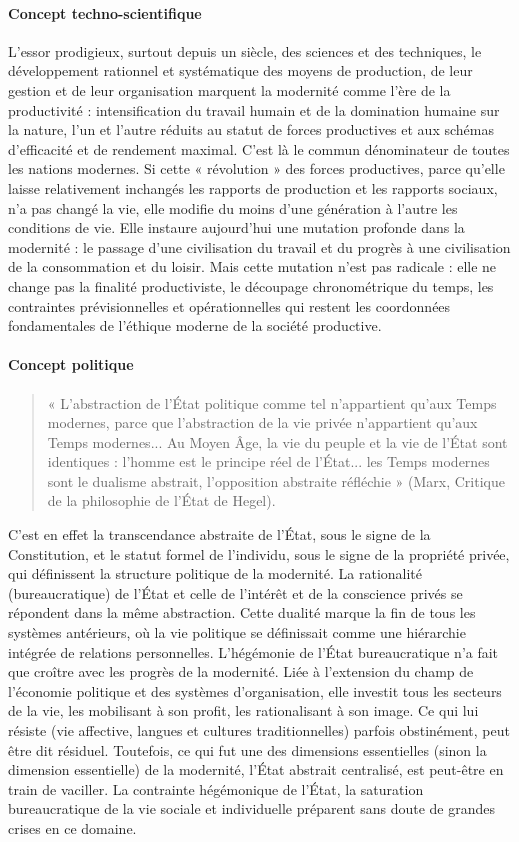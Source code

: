 \paragraph{Concept techno-scientifique}

L'essor prodigieux, surtout depuis un siècle, des sciences et des techniques, le développement rationnel et systématique des moyens de production, de leur gestion et de leur organisation marquent la modernité comme l'ère de la productivité : intensification du travail humain et de la domination humaine sur la nature, l'un et l'autre réduits au statut de forces productives et aux schémas d'efficacité et de rendement maximal. C'est là le commun dénominateur de toutes les nations modernes. Si cette « révolution » des forces productives, parce qu'elle laisse relativement inchangés les rapports de production et les rapports sociaux, n'a pas changé la vie, elle modifie du moins d'une génération à l'autre les conditions de vie. Elle instaure aujourd'hui une mutation profonde dans la modernité : le passage d'une civilisation du travail et du progrès à une civilisation de la consommation et
du loisir. Mais cette mutation n'est pas radicale : elle ne change pas la finalité productiviste, le découpage chronométrique du temps, les contraintes prévisionnelles et opérationnelles qui restent les coordonnées fondamentales de l'éthique moderne de la société productive.
\paragraph{Concept politique}
\begin{quote}
    « L'abstraction de l'État politique comme tel n'appartient qu'aux Temps modernes, parce que l'abstraction de la vie privée n'appartient qu'aux Temps modernes... Au Moyen Âge, la vie du peuple et la vie de l'État sont identiques : l'homme est le principe réel de l'État... les Temps modernes sont le dualisme abstrait, l'opposition abstraite réfléchie » (Marx, Critique de la philosophie de l'État de Hegel).
\end{quote}

C'est en effet la transcendance abstraite de l'État, sous le signe de la Constitution, et le statut formel de l'individu, sous le signe de la propriété privée, qui définissent la structure politique de la modernité. La rationalité (bureaucratique) de l'État et celle de l'intérêt et de la conscience privés se répondent dans la même abstraction. Cette dualité marque la fin de tous les systèmes antérieurs, où la vie politique se définissait comme une hiérarchie intégrée de relations personnelles. L'hégémonie de l'État bureaucratique n'a fait que croître avec les progrès de la modernité. Liée à l'extension du champ de l'économie politique et des systèmes d'organisation, elle investit tous les secteurs de la vie, les mobilisant à son profit, les rationalisant à son image. Ce qui lui résiste (vie affective, langues et cultures traditionnelles) parfois obstinément, peut être dit résiduel. Toutefois, ce qui fut une des dimensions essentielles (sinon la dimension essentielle) de la modernité, l'État abstrait centralisé, est peut-être en train de vaciller. La contrainte hégémonique de l'État, la saturation bureaucratique de la vie sociale et individuelle préparent sans doute de grandes crises en ce domaine.
